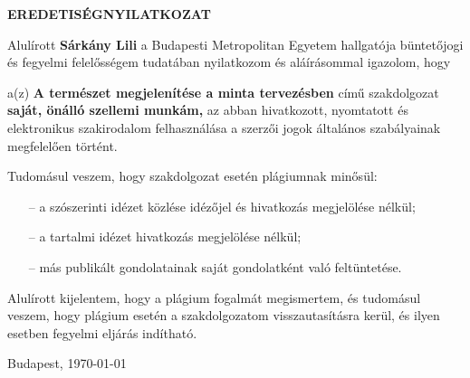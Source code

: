 \thispagestyle{plain}
\begin{center}
    \Large
    \textbf{EREDETISÉGNYILATKOZAT}
\end{center}
        
    \vspace{2 cm}

    
\normalsize
Alulírott  \textbf{Sárkány Lili} a Budapesti Metropolitan Egyetem hallgatója
büntetőjogi és fegyelmi felelősségem tudatában nyilatkozom és aláírásommal igazolom, hogy

a(z) \textbf{A természet megjelenítése a minta tervezésben} című szakdolgozat \textbf{saját, önálló szellemi munkám,} az abban hivatkozott, nyomtatott és elektronikus szakirodalom felhasználása
a szerzői jogok általános szabályainak megfelelően történt.

Tudomásul veszem, hogy szakdolgozat esetén plágiumnak minősül:
\begin{itemize}
    \item[--] a szószerinti idézet közlése idézőjel és hivatkozás megjelölése nélkül;
    \item[--] a tartalmi idézet hivatkozás megjelölése nélkül;
    \item[--] más publikált gondolatainak saját gondolatként való feltüntetése.
\end{itemize}

Alulírott kijelentem, hogy a plágium fogalmát megismertem, és tudomásul veszem, hogy
plágium esetén a szakdolgozatom visszautasításra kerül, és ilyen esetben fegyelmi eljárás
indítható.

\pushtobottom

Budapest, \today
{}

\vfill
